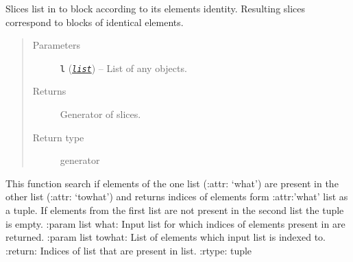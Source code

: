 \documentclass[a4paper,10pt,english]{sphinxmanual}
\begin{document}

\begin{fulllineitems}
\label{aqueduct.utils.helpers:aqueduct.utils.helpers.list_blocks_to_slices}
Slices list in to block according to its elements identity. Resulting slices correspond to blocks of
identical elements.
\begin{quote}\begin{description}
\item[{Parameters}] \leavevmode
\textbf{\texttt{l}} (\href{http://docs.python.org/2/library/functions.html\#list}{\emph{\texttt{list}}}) -- List of any objects.

\item[{Returns}] \leavevmode
Generator of slices.

\item[{Return type}] \leavevmode
generator

\end{description}\end{quote}

\end{fulllineitems}


\begin{fulllineitems}
\label{aqueduct.utils.helpers:aqueduct.utils.helpers.what2what}
This function search if elements of the one list (:attr: `what') are present in the other list (:attr: `towhat') and returns indices of elements form :attr:'what' list as a tuple.
If elements from the first list are not present in the second list the tuple is empty.
:param list what: Input list for which indices of elements present in  are returned.
:param list towhat: List of elements which input list is indexed to.
:return: Indices of  list that are present in  list.
:rtype: tuple

\end{fulllineitems}

\end{document}
